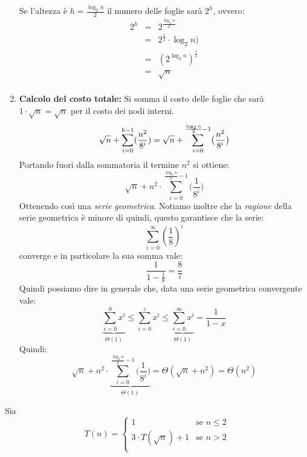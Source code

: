 \begin{enumerate}
	Se l'altezza è $h= \frac{\log_{2}n}{2}$ il numero delle foglie sarà $2^{h}$, ovvero:
	\begin{eqnarray*}
	2^{h} &=& 2^{\frac{\log_{2}n}{2}} \\
	&=&  2^{\frac{1}{2}}\cdot \log_{2}n) \\
	&=& (2^{\log_{2}n})^{ \frac{1}{2}} \\
	&=& \sqrt{n} \\
	\end{eqnarray*}
	\item \textbf{Calcolo del costo totale: } Si somma il costo delle foglie che sarà $1 \cdot \sqrt{n} = \sqrt{n}$ per il costo dei nodi interni.
	\begin{displaymath}
	\sqrt{n}+ \sum_{i=0}^{h-1} (\frac{n^{2}}{8^{i}}) = \sqrt{n}+\sum_{i=0}^{\frac{\log_{2}n}{2}-1} \bigl( \frac{n^{2}}{8^{i}} \bigl)\\
	\end{displaymath}
	Portando fuori dalla sommatoria il termine $n^{2}$ si ottiene:
	\begin{displaymath}
	\sqrt{n}+n^{2}\cdot \sum_{i=0}^{\frac{\log_{2}n}{2}-1} \bigl( \frac{1}{8^{i}} \bigl)
	\end{displaymath}
	Ottenendo così una \textit{serie geometrica}. Notiamo inoltre che la \textit{ragione} della serie geometrica è minore di quindi, questo garantisce che la serie:
	\begin{displaymath}
	\sum_{i=0}^{\infty}(\frac{1}{8})^{i}
	\end{displaymath}
	converge e in particolare la sua somma vale:
	\begin{displaymath}
	\frac{1}{1-\frac{1}{8}}= \frac{8}{7}
	\end{displaymath}
	Quindi possiamo dire in generale che, data una serie geometrica convergente vale:
	\begin{displaymath}
	\underbrace{\sum_{i=0}^{0} x^{i}}_{\Theta(1)} \leq \sum_{i=0}^{z} x^{i} \leq \underbrace{\sum_{i=0}^{\infty} x^{i}}_{\Theta(1)} = \frac{1}{1-x}
	\end{displaymath}
	Quindi:
	\begin{displaymath}
	\sqrt{n}+n^{2}\cdot \underbrace{\sum_{i=0}^{\frac{\log_{2}n}{2}-1} \bigl( \frac{1}{8^{i}} \bigl)}_{\Theta(1)} = \Theta(\sqrt{n}+n^{2}) = \Theta(n^{2})
	\end{displaymath}
\end{enumerate}

\begin{example}
	Sia
\begin{displaymath}
	T(n)=
	\begin{cases}
		1 & \mbox{se } n \leq 2\\
		3 \cdot T(\sqrt{n}) + 1 & \mbox{se } n>2 \\
	\end{cases}
\end{displaymath}
\end{example}

